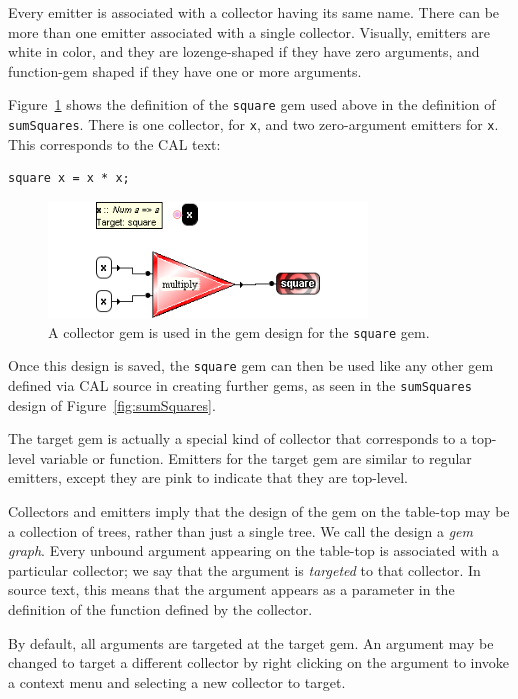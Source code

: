 \documentclass[preprint]{sigplanconf}
\begin{document}
Every emitter is associated with a collector having its same
name. There can be more than one emitter associated with a single
collector. Visually, emitters are white in color, and they are
lozenge-shaped if they have zero arguments, and function-gem shaped if
they have one or more arguments.

Figure~\ref{fig:square} shows the definition of the {\tt square} gem used above
in the definition of {\tt sumSquares}. There is one collector, for
{\tt x}, and two zero-argument emitters for {\tt x}. 
This corresponds to the CAL text:
\begin{verbatim}
square x = x * x;
\end{verbatim}

\begin{figure}[htb]
  \centering
  \includegraphics[width=20pc]{square.png}
  \caption{A collector gem is used in the gem design for the {\tt square} gem.}
  \label{fig:square}
\end{figure}

Once this design is saved, the {\tt square} gem can then be used like
any other gem defined via CAL source in creating further gems, as seen
in the {\tt sumSquares} design of Figure~\ref{fig:sumSquares}.

The target gem is actually a special kind of collector that corresponds to a
top-level variable or function. Emitters for the target gem are
similar to regular emitters, except they are pink to indicate that
they are top-level.

Collectors and emitters imply that the design of the gem on the
table-top may be a collection of trees, rather than just a single
tree. We call the design a {\it gem graph}. Every unbound
argument appearing on the table-top is associated with a particular
collector; we say that the argument is {\it targeted} to that
collector. In source text, this means that the argument appears as
a parameter in the definition of the function defined by the
collector. 

By default, all arguments are targeted at the target gem. An argument
may be changed to target a different collector by right clicking on
the argument to invoke a context menu and selecting a new collector to
target.
\end{document}
